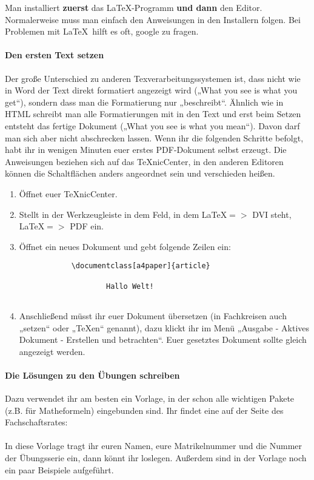 Man installiert \textbf{zuerst} das \LaTeX-Programm \textbf{und dann} den Editor.
Normalerweise muss man einfach den Anweisungen in den Installern folgen.
Bei Problemen mit \LaTeX~hilft es oft, google zu fragen.

\paragraph{Den ersten Text setzen}
Der große Unterschied zu anderen Texverarbeitungssystemen ist, dass nicht wie in Word der Text direkt formatiert angezeigt wird („What you see is what you get“), sondern dass man die Formatierung nur „beschreibt“.
Ähnlich wie in HTML schreibt man alle Formatierungen mit in den Text und erst beim Setzen entsteht das fertige Dokument („What you see is what you mean“).
Davon darf man sich aber nicht abschrecken lassen.
Wenn ihr die folgenden Schritte befolgt, habt ihr in wenigen Minuten euer erstes PDF-Dokument selbst erzeugt.
Die Anweisungen beziehen sich auf das \TeX nicCenter, in den anderen Editoren können die Schaltflächen anders angeordnet sein und verschieden heißen.

\begin{enumerate}
 \item Öffnet euer \TeX nicCenter.
 \item Stellt in der Werkzeugleiste in dem Feld, in dem \LaTeX $=>$ DVI steht, \LaTeX $=>$ PDF ein.
 \item Öffnet ein neues Dokument und gebt folgende Zeilen ein:
    \begin{verbatim}
            \documentclass[a4paper]{article}
            
                    Hallo Welt!
            
    \end{verbatim}
 \item Anschließend müsst ihr euer Dokument übersetzen (in Fachkreisen auch „setzen“ oder „\TeX en“ genannt),
       dazu klickt ihr im Menü „Ausgabe - Aktives Dokument -
       Erstellen und betrachten“. Euer gesetztes Dokument sollte
       gleich angezeigt werden.
\end{enumerate}

\paragraph{Die Lösungen zu den Übungen schreiben}
Dazu verwendet ihr am besten ein Vorlage, in der schon alle wichtigen Pakete (z.B. für Matheformeln) eingebunden sind.
Ihr findet eine auf der Seite des Fachschaftsrates:\\
\\
In diese Vorlage tragt ihr euren Namen, eure Matrikelnummer und die Nummer der Übungsserie ein, dann könnt ihr loslegen.
Außerdem sind in der Vorlage noch ein paar Beispiele aufgeführt.

